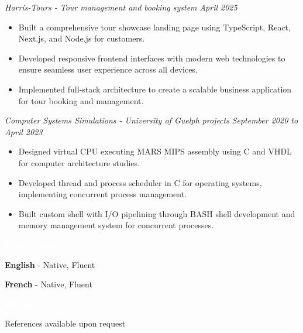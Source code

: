\documentclass[9pt]{src/developercv}
\begin{document}
  \textit{Harris-Tours - Tour management and booking system} \hfill \textit{April 2025}
  \begin{itemize}[leftmargin=2em, rightmargin=2.5em, itemsep=0.1em]
    \item Built a comprehensive tour showcase landing page using TypeScript, React, Next.js, and Node.js for customers.
    \item Developed responsive frontend interfaces with modern web technologies to ensure seamless user experience across all devices.
    \item Implemented full-stack architecture to create a scalable business application for tour booking and management.
  \end{itemize}

  \vspace{1.0\baselineskip}
  
  \textit{Computer Systems Simulations - University of Guelph projects} \hfill \textit{September 2020 to April 2023}
  \begin{itemize}[leftmargin=2em, rightmargin=2.5em, itemsep=0.1em]
    \item Designed virtual CPU executing MARS MIPS assembly using C and VHDL for computer architecture studies.
    \item Developed thread and process scheduler in C for operating systems, implementing concurrent process management.
    \item Built custom shell with I/O pipelining through BASH shell development and memory management system for concurrent processes.
  \end{itemize}

  \vspace{\baselineskip}
  \colorbox{sky700}{\textcolor{white}{\LARGE\MakeUppercase{\textbf{Languages}}}}\\

  \vspace{1.0\baselineskip}

  \textbf{English} - Native, Fluent

  \vspace{1.0\baselineskip}

  \textbf{French} - Native, Fluent

  \vspace{\baselineskip}
  \colorbox{sky600}{\textcolor{white}{\LARGE\MakeUppercase{\textbf{References}}}}\\

  \vspace{1.0\baselineskip}
  
  \large References available upon request
\end{document}
